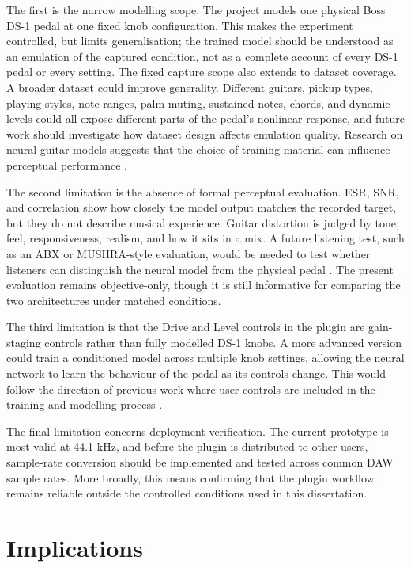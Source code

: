 The first is the narrow modelling scope. The project models one physical Boss DS-1 pedal at one fixed knob configuration. This makes the experiment controlled, but limits generalisation; the trained model should be understood as an emulation of the captured condition, not as a complete account of every DS-1 pedal or every setting. The fixed capture scope also extends to dataset coverage. A broader dataset could improve generality. Different guitars, pickup types, playing styles, note ranges, palm muting, sustained notes, chords, and dynamic levels could all expose different parts of the pedal's nonlinear response, and future work should investigate how dataset design affects emulation quality. Research on neural guitar models suggests that the choice of training material can influence perceptual performance \cite{cassidy_perceptual_2023}.

The second limitation is the absence of formal perceptual evaluation. ESR, SNR, and correlation show how closely the model output matches the recorded target, but they do not describe musical experience. Guitar distortion is judged by tone, feel, responsiveness, realism, and how it sits in a mix. A future listening test, such as an ABX or MUSHRA-style evaluation, would be needed to test whether listeners can distinguish the neural model from the physical pedal \cite{cassidy_perceptual_2023,ITU_BS1534_3}. The present evaluation remains objective-only, though it is still informative for comparing the two architectures under matched conditions.

The third limitation is that the Drive and Level controls in the plugin are gain-staging controls rather than fully modelled DS-1 knobs. A more advanced version could train a conditioned model across multiple knob settings, allowing the neural network to learn the behaviour of the pedal as its controls change. This would follow the direction of previous work where user controls are included in the training and modelling process \cite{wright_real-time_2019,cassidy_perceptual_2023}.

The final limitation concerns deployment verification. The current prototype is most valid at 44.1 kHz, and before the plugin is distributed to other users, sample-rate conversion should be implemented and tested across common DAW sample rates. More broadly, this means confirming that the plugin workflow remains reliable outside the controlled conditions used in this dissertation.

\section{Implications}

